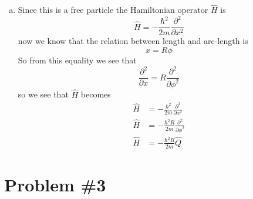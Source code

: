 \documentclass[11pt]{article}
\numberwithin{equation}{section}
\begin{document}
\begin{enumerate}[(a)]
\item
Since this is a free particle the Hamiltonian operator $\hat{H}$ is
$$\hat{H} = -\frac{\hbar^2}{2m}\frac{\partial^2}{\partial x^2}$$
now we know that the relation between length and arc-length is
$$x = R\phi$$
So from this equality we see that
$$\frac{\partial^2}{\partial x} = R\frac{\partial^2}{\partial\phi^2}$$
so we see that $\hat{H}$ becomes
\begin{align*}
\hat{H} &= -\frac{\hbar^2}{2m}\frac{\partial^2}{\partial x^2}\\
\hat{H} &= -\frac{\hbar^2R}{2m}\frac{\partial^2}{\partial\phi^2}\\
\hat{H} &= -\frac{\hbar^2R}{2m}\hat{Q}
\end{align*}
\end{enumerate}

\section{Problem \#3}
\end{document}
